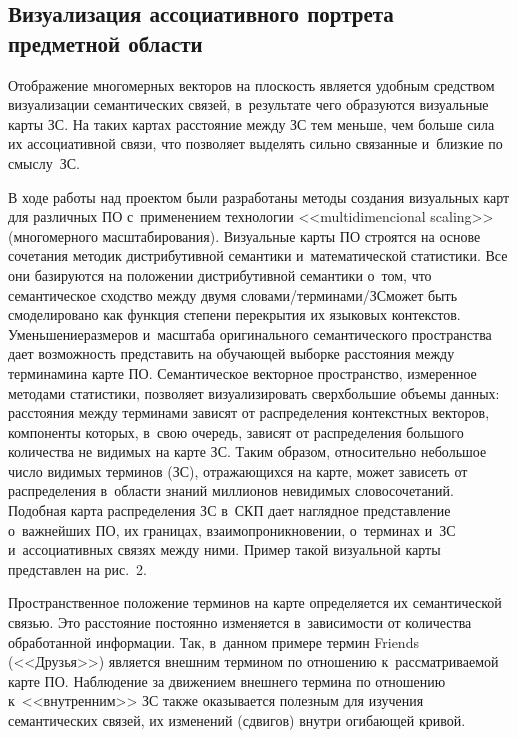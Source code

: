\begin{multicols}{2}
\vspace*{-6pt}

    \section{Визуализация ассоциативного портрета предметной области}

     Отображение многомерных векторов на плоскость является удобным
средством визуализации семантических связей, в~результате чего образуются
визуальные карты ЗС. На таких картах расстояние
между ЗС тем меньше, чем больше сила их ассоциативной связи, что
позволяет выделять сильно связанные и~близкие по смыс\-лу~ЗС.

     В ходе работы над проектом были разработаны методы создания
визуальных карт для различных ПО с~применением
технологии <<multidimencional scaling>> (многомерного масштабирования).
Визуальные карты ПО строятся на основе сочетания
методик дистрибутивной семантики и~математической статистики. Все они
базируются на положении дистрибутивной семантики о~том, что
семантическое сходство между двумя сло\-ва\-ми/тер\-ми\-на\-ми/ЗС\linebreak может быть
смоделировано как функция степени перекрытия их языковых контекстов.
Уменьшение\linebreak размеров и~масштаба оригинального семантического
пространства дает возможность представить на обуча\-ющей выборке
расстояния между терминами\linebreak на карте ПО. Семантическое
векторное пространство, измеренное методами статистики, позволяет
визуализировать сверхбольшие объемы данных: расстояния между
терминами зависят от распределения контекстных векторов, компоненты
которых, в~свою очередь, зависят от распределения большого количества не
видимых на карте ЗС. Таким образом, относительно небольшое число
видимых терминов (ЗС), отражающихся на карте, может зависеть от
распределения в~об\-ласти знаний миллионов невидимых словосочетаний.
Подобная карта распределения ЗС в~СКП дает наглядное пред\-став\-ле\-ние о~важнейших ПО, их границах, взаимопроникновении, о~терминах и~ЗС и~ассоциативных связях между ними.
Пример такой визуальной карты представлен на рис.~2.




     Пространственное положение терминов на карте определяется их
семантической связью. Это расстояние постоянно изменяется в~зависимости
от количества обработанной информации. Так, в~данном примере термин
Friends (<<Друзья>>) является внешним термином по отношению к~рассматриваемой карте ПО. Наблюдение за движением
внешнего термина по отношению к~<<внутренним>> ЗС также оказывается
полезным для изучения семантических связей, их изменений (сдвигов)
внутри огибающей кривой.


\end{multicols}
